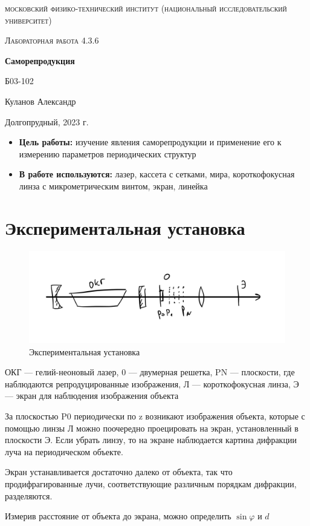 \documentclass[a4paper, 12pt]{article}
\begin{document}
\begin{titlepage}
	\centering
	\vspace{5cm}
	{\scshape\LARGE московский физико-технический институт (национальный исследовательский университет) \par}
	\vspace{6cm}
	{\scshape\Large Лабораторная работа 4.3.6 \par}
	{\huge\bfseries Саморепродукция \par}
	\vspace{1cm}
	\vfill
\begin{flushright}
	{\large Б03-102}\par
	\vspace{0.3cm}
	{\LARGE Куланов Александр}
\end{flushright}
	

	\vfill


	Долгопрудный, 2023 г.
\end{titlepage}

\begin{itemize}
	\item \textbf{Цель работы:} изучение явления саморепродукции и применение его к измерению параметров периодических структур
    \item \textbf{В работе используются:} лазер, кассета с сетками, мира, короткофокусная линза с микрометрическим винтом, экран, линейка
\end{itemize}

\section{Экспериментальная установка}

\begin{figure}[H]
    \centering
    \includegraphics[width=1\textwidth]{set.jpg}
    \caption{Экспериментальная установка}
    \label{fig:set}
\end{figure}

ОКГ --- гелий-неоновый лазер, 0 --- двумерная решетка, PN --- плоскости, где наблюдаются репродуцированные изображения, Л --- короткофокусная линза, Э --- экран для наблюдения изображения объекта

За плоскостью P0 периодически по z возникают изображения объекта, которые с помощью линзы Л можно поочередно проецировать на экран, установленный в плоскости Э.
Если убрать линзу, то на экране наблюдается картина дифракции луча на периодическом объекте.

Экран устанавливается достаточно далеко от объекта, так что продифрагированные лучи, соответствующие различным порядкам дифракции, разделяются.

Измерив расстояние от объекта до экрана, можно определить $\sin \varphi$ и $d$
\end{document}
